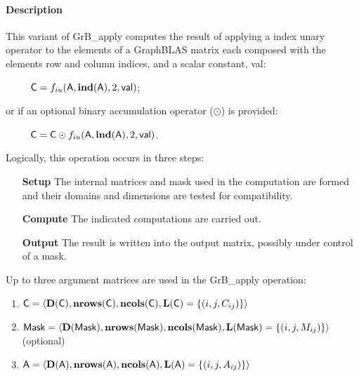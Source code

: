 \paragraph{Description}

{\color{red}
This variant of {\sf GrB\_apply} computes the result of applying a index unary operator
to the elements of a GraphBLAS matrix each composed with the elements row and column
indices, and a scalar constant, {\sf val}:   
\begin{itemize}[leftmargin=2.1in]
\item[~] ${\sf C} = f_{iu}({\sf A}, \bold{ind}({\sf A}), 2, {\sf val})$;
\end{itemize}
or if an optional binary accumulation operator ($\odot$) is provided:  
\begin{itemize}[leftmargin=2.1in]
\item[~] ${\sf C} = {\sf C} \odot f_{iu}({\sf A}, \bold{ind}({\sf A}), 2, {\sf val})$.  
\end{itemize}
}

Logically, this operation occurs in three steps:
\begin{enumerate}[leftmargin=0.85in]
\item[\bf Setup] The internal matrices and mask used in the computation are formed 
and their domains and dimensions are tested for compatibility.
\item[\bf Compute] The indicated computations are carried out.
\item[\bf Output] The result is written into the output matrix, possibly under 
control of a mask.
\end{enumerate}

Up to three argument matrices are used in the {\sf GrB\_apply} operation:
\begin{enumerate}
    \item ${\sf C} = \langle \bold{D}({\sf C}),\bold{nrows}({\sf C}),
    \bold{ncols}({\sf C}),\bold{L}({\sf C}) = \{(i,j,C_{ij}) \} \rangle$

    \item ${\sf Mask} = \langle \bold{D}({\sf Mask}),\bold{nrows}({\sf Mask}),
    \bold{ncols}({\sf Mask}),\bold{L}({\sf Mask}) = \{(i,j,M_{ij}) \} \rangle$ (optional)

    \item ${\sf A} = \langle \bold{D}({\sf A}),\bold{nrows}({\sf A}),
    \bold{ncols}({\sf A}),\bold{L}({\sf A}) = \{(i,j,A_{ij}) \} \rangle$
\end{enumerate}

